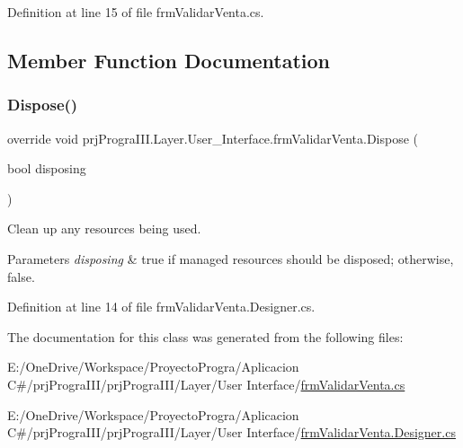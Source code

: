 Definition at line 15 of file frm\+Validar\+Venta.\+cs.



\subsection{Member Function Documentation}
\hypertarget{classprj_progra_i_i_i_1_1_layer_1_1_user___interface_1_1frm_validar_venta_afaac605b199f4f58c5e95b2a50a7fd0c}{}\label{classprj_progra_i_i_i_1_1_layer_1_1_user___interface_1_1frm_validar_venta_afaac605b199f4f58c5e95b2a50a7fd0c} 
\subsubsection{\texorpdfstring{Dispose()}{Dispose()}}
{\footnotesize\ttfamily override void prj\+Progra\+I\+I\+I.\+Layer.\+User\+\_\+\+Interface.\+frm\+Validar\+Venta.\+Dispose (\begin{DoxyParamCaption}\item[{bool}]{disposing }\end{DoxyParamCaption})\hspace{0.3cm}{\ttfamily [protected]}}



Clean up any resources being used. 


\begin{DoxyParams}{Parameters}
{\em disposing} & true if managed resources should be disposed; otherwise, false.\\
\hline
\end{DoxyParams}


Definition at line 14 of file frm\+Validar\+Venta.\+Designer.\+cs.



The documentation for this class was generated from the following files\+:\begin{DoxyCompactItemize}
\item 
E\+:/\+One\+Drive/\+Workspace/\+Proyecto\+Progra/\+Aplicacion C\#/prj\+Progra\+I\+I\+I/prj\+Progra\+I\+I\+I/\+Layer/\+User Interface/\hyperlink{frm_validar_venta_8cs}{frm\+Validar\+Venta.\+cs}\item 
E\+:/\+One\+Drive/\+Workspace/\+Proyecto\+Progra/\+Aplicacion C\#/prj\+Progra\+I\+I\+I/prj\+Progra\+I\+I\+I/\+Layer/\+User Interface/\hyperlink{frm_validar_venta_8_designer_8cs}{frm\+Validar\+Venta.\+Designer.\+cs}\end{DoxyCompactItemize}
